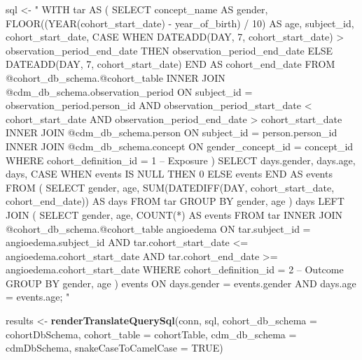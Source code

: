 \documentclass[11pt]{book}
\newenvironment{Shaded}{\begin{snugshade}}{\end{snugshade}}
\newcommand{\DataTypeTok}[1]{\textcolor[rgb]{0.13,0.29,0.53}{#1}}
\newcommand{\KeywordTok}[1]{\textcolor[rgb]{0.13,0.29,0.53}{\textbf{#1}}}
\newcommand{\NormalTok}[1]{#1}
\newcommand{\OtherTok}[1]{\textcolor[rgb]{0.56,0.35,0.01}{#1}}
\newcommand{\StringTok}[1]{\textcolor[rgb]{0.31,0.60,0.02}{#1}}
\theoremstyle{definition}
\theoremstyle{definition}
\theoremstyle{definition}
\theoremstyle{remark}
\begin{document}
\begin{Shaded}
\begin{Highlighting}[]
\NormalTok{sql <-}\StringTok{ "}
\StringTok{WITH tar AS (}
\StringTok{  SELECT concept_name AS gender,}
\StringTok{    FLOOR((YEAR(cohort_start_date) -}
\StringTok{          year_of_birth) / 10) AS age,}
\StringTok{    subject_id,}
\StringTok{    cohort_start_date,}
\StringTok{    CASE WHEN DATEADD(DAY, 7, cohort_start_date) >}
\StringTok{      observation_period_end_date}
\StringTok{    THEN observation_period_end_date}
\StringTok{    ELSE DATEADD(DAY, 7, cohort_start_date)}
\StringTok{    END AS cohort_end_date}
\StringTok{  FROM @cohort_db_schema.@cohort_table}
\StringTok{  INNER JOIN @cdm_db_schema.observation_period}
\StringTok{    ON subject_id = observation_period.person_id}
\StringTok{      AND observation_period_start_date < cohort_start_date}
\StringTok{      AND observation_period_end_date > cohort_start_date}
\StringTok{  INNER JOIN @cdm_db_schema.person}
\StringTok{    ON subject_id = person.person_id}
\StringTok{  INNER JOIN @cdm_db_schema.concept}
\StringTok{    ON gender_concept_id = concept_id}
\StringTok{  WHERE cohort_definition_id = 1 -- Exposure}
\StringTok{)}
\StringTok{SELECT days.gender,}
\StringTok{    days.age,}
\StringTok{    days,}
\StringTok{    CASE WHEN events IS NULL THEN 0 ELSE events END AS events}
\StringTok{FROM (}
\StringTok{  SELECT gender,}
\StringTok{    age,}
\StringTok{    SUM(DATEDIFF(DAY, cohort_start_date,}
\StringTok{      cohort_end_date)) AS days}
\StringTok{  FROM tar}
\StringTok{  GROUP BY gender,}
\StringTok{    age}
\StringTok{) days}
\StringTok{LEFT JOIN (}
\StringTok{  SELECT gender,}
\StringTok{      age,}
\StringTok{      COUNT(*) AS events}
\StringTok{  FROM tar}
\StringTok{  INNER JOIN @cohort_db_schema.@cohort_table angioedema}
\StringTok{    ON tar.subject_id = angioedema.subject_id}
\StringTok{      AND tar.cohort_start_date <= angioedema.cohort_start_date}
\StringTok{      AND tar.cohort_end_date >= angioedema.cohort_start_date}
\StringTok{  WHERE cohort_definition_id = 2 -- Outcome}
\StringTok{  GROUP BY gender,}
\StringTok{    age}
\StringTok{) events}
\StringTok{ON days.gender = events.gender}
\StringTok{  AND days.age = events.age;}
\StringTok{"}

\NormalTok{results <-}\StringTok{ }\KeywordTok{renderTranslateQuerySql}\NormalTok{(conn, sql,}
                                   \DataTypeTok{cohort_db_schema =}\NormalTok{ cohortDbSchema,}
                                   \DataTypeTok{cohort_table =}\NormalTok{ cohortTable,}
                                   \DataTypeTok{cdm_db_schema =}\NormalTok{ cdmDbSchema,}
                                   \DataTypeTok{snakeCaseToCamelCase =} \OtherTok{TRUE}\NormalTok{)}
\end{Highlighting}
\end{Shaded}
\end{document}
